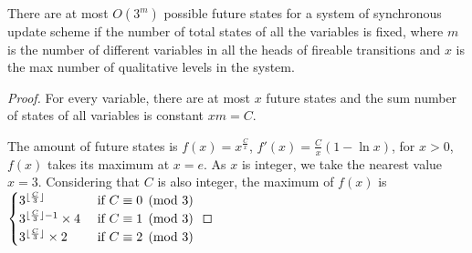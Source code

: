 \begin{theorem}
    There are at most $O(3^m)$ possible future states for a system of synchronous update scheme if the number of total states of all the variables is fixed, where $m$ is the number of different variables in all the heads of fireable transitions and $x$ is the max number of qualitative levels in the system. 
    \begin{proof}
         For every variable, there are at most $x$ future states and the sum number of states of all variables is constant $xm=C$.
         
         The amount of future states is $f(x)=x^{\frac{C}{x}}$, $f'(x)=\frac{C}{x}(1-\ln x)$, for $x>0$, $f(x)$ takes its maximum at $x=e$.
         As $x$ is integer, we take the nearest value $x=3$.
         Considering that $C$ is also integer, the maximum of $f(x)$ is
         $
         \begin{cases}
         3^{\lfloor\frac{C}{3}\rfloor}&\text{ if } C\equiv 0 \pmod 3\\
         3^{\lfloor\frac{C}{3}\rfloor-1}\times 4&\text{ if } C\equiv 1 \pmod 3\\
         3^{\lfloor\frac{C}{3}\rfloor}\times 2&\text{ if } C\equiv 2 \pmod 3
         \end{cases}$
    \end{proof}
\end{theorem}

